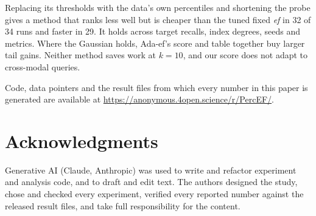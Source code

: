 \documentclass[10pt,journal,compsoc]{IEEEtran}
\newcommand{\ef}{\textit{ef}}
\begin{document}
Replacing its thresholds with the data's own percentiles and shortening the probe gives a method
that ranks less well but is cheaper than the tuned fixed \ef{} in 32 of 34 runs and faster in 29. It
holds across target recalls, index degrees, seeds and metrics. Where the Gaussian holds, Ada-ef's
score and table together buy larger tail gains. Neither method saves work at $k = 10$, and our score
does not adapt to cross-modal queries.

Code, data pointers and the result files from which every number in this paper is generated are
available at \url{https://anonymous.4open.science/r/PercEF/}.

\section*{Acknowledgments}
Generative AI (Claude, Anthropic) was used to write and refactor experiment and analysis code,
and to draft and edit text. The authors designed the study, chose and checked every
experiment, verified every reported number against the released result files, and take
full responsibility for the content.



\end{document}
